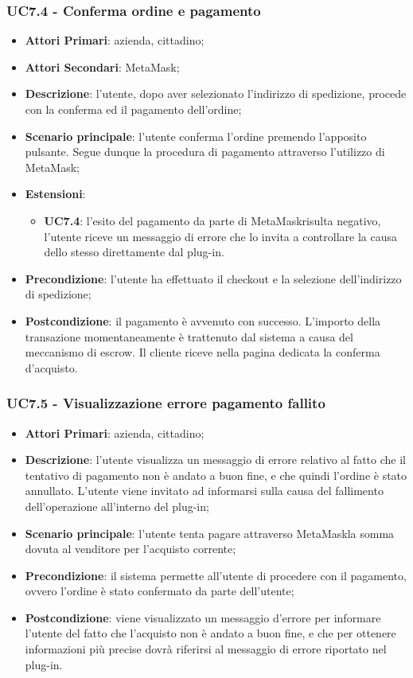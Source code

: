 \subsubsection{UC7.4 - Conferma ordine e pagamento}
\begin{itemize}
	\item \textbf{Attori Primari}: azienda, cittadino;
	\item \textbf{Attori Secondari}: MetaMask\glo;
	\item \textbf{Descrizione}: l'utente, dopo aver selezionato l'indirizzo di spedizione, procede con la conferma ed il pagamento dell'ordine;
	\item \textbf{Scenario principale}: l'utente conferma l'ordine premendo l'apposito pulsante. Segue dunque la procedura di pagamento attraverso l'utilizzo di MetaMask\glo;
	\item \textbf{Estensioni}: 
	\begin{itemize}
		\item \textbf{UC7.4}: l'esito del pagamento da parte di MetaMask\glosp risulta negativo, l'utente riceve un messaggio di errore che lo invita a controllare la causa dello stesso direttamente dal plug-in\glo. 
	\end{itemize}
	\item \textbf{Precondizione}: l'utente ha effettuato il checkout e la selezione dell'indirizzo di spedizione;
	\item \textbf{Postcondizione}: il pagamento è avvenuto con successo. 
	L'importo della transazione momentaneamente è trattenuto dal sistema a 
	causa del meccanismo di escrow\glo. Il cliente riceve nella pagina dedicata 
	la conferma d'acquisto\glo.
\end{itemize}


\subsubsection{UC7.5 - Visualizzazione errore pagamento fallito}
\begin{itemize}
	\item \textbf{Attori Primari}: azienda, cittadino;
	\item \textbf{Descrizione}:
	l'utente visualizza un messaggio di errore relativo al fatto che il tentativo di pagamento non è andato a buon fine, e che quindi l'ordine è stato annullato. L'utente viene invitato ad informarsi sulla causa del fallimento dell'operazione all'interno del plug-in;
	\item \textbf{Scenario principale}: l'utente tenta pagare attraverso MetaMask\glosp la somma dovuta al venditore per l'acquisto corrente;
	\item \textbf{Precondizione}: il sistema permette all'utente di procedere con il pagamento, ovvero l'ordine è stato confermato da parte dell'utente;
	\item \textbf{Postcondizione}: viene visualizzato un messaggio d'errore per informare l'utente del fatto che l'acquisto non è andato a buon fine, e che per ottenere informazioni più precise dovrà riferirsi al messaggio di errore riportato nel plug-in. 
\end{itemize} 






